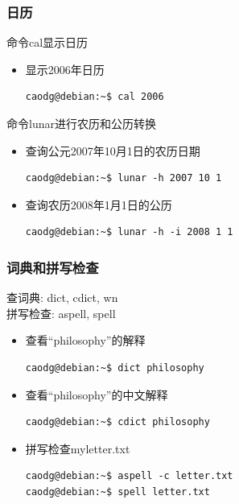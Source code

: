 \documentclass[compress]{beamer}
\begin{document}
\begin{frame}[containsverbatim]
  \frametitle{日历}

命令\alert{cal}显示日历
\begin{itemize}
\item 显示2006年日历\\[1ex]
\begin{Verbatim}
caodg@debian:~$ cal 2006
\end{Verbatim}
\end{itemize}

命令\alert{lunar}进行农历和公历转换
\begin{itemize}
\item  查询公元2007年10月1日的农历日期 \\
\begin{Verbatim}
caodg@debian:~$ lunar -h 2007 10 1
\end{Verbatim}
\item  查询农历2008年1月1日的公历 \\
\begin{Verbatim}
caodg@debian:~$ lunar -h -i 2008 1 1
\end{Verbatim}

\end{itemize}

 
\end{frame}

\begin{frame}[containsverbatim]
\frametitle{词典和拼写检查}
查词典: \alert{dict}, \alert{cdict}, \alert{wn}\\
拼写检查: \alert{aspell}, \alert{spell}

\begin{itemize}
\item 查看``philosophy''的解释\\[1ex]
\begin{Verbatim}
caodg@debian:~$ dict philosophy
\end{Verbatim}

\item 查看``philosophy''的中文解释\\[1ex]
\begin{Verbatim}
caodg@debian:~$ cdict philosophy
\end{Verbatim}

\item 拼写检查myletter.txt\\[1ex]
\begin{Verbatim}
caodg@debian:~$ aspell -c letter.txt
caodg@debian:~$ spell letter.txt
\end{Verbatim}

\end{itemize}


\end{frame}
\end{document}
